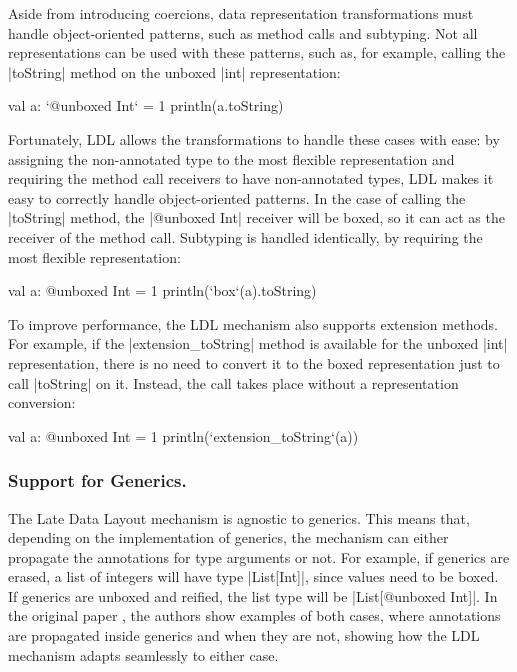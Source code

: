 Aside from introducing coercions, data representation transformations must handle object-oriented patterns, such as method calls and subtyping. Not all representations can be used with these patterns, such as, for example, calling the |toString| method on the unboxed |int| representation:

\begin{lstlisting-nobreak}
val a: `@unboxed Int` = 1
println(a.toString)
\end{lstlisting-nobreak}

Fortunately, LDL allows the transformations to handle these cases with ease: by assigning the non-annotated type to the most flexible representation and requiring the method call receivers to have non-annotated types, LDL makes it easy to correctly handle object-oriented patterns. In the case of calling the |toString| method, the |@unboxed Int| receiver will be boxed, so it can act as the receiver of the method call. Subtyping is handled identically, by requiring the most flexible representation:

\begin{lstlisting-nobreak}
val a: @unboxed Int = 1
println(`box`(a).toString)
\end{lstlisting-nobreak}

To improve performance, the LDL mechanism also supports extension methods. For example, if the |extension_toString| method is available for the unboxed |int| representation, there is no need to convert it to the boxed representation just to call |toString| on it. Instead, the call takes place without a representation conversion:

\begin{lstlisting-nobreak}
val a: @unboxed Int = 1
println(`extension_toString`(a))
\end{lstlisting-nobreak}

\subsubsection{Support for Generics.}
The Late Data Layout mechanism is agnostic to generics. This means that, depending on the implementation of generics, the mechanism can either propagate the annotations for type arguments or not. For example, if generics are erased, a list of integers will have type |List[Int]|, since values need to be boxed. If generics are unboxed and reified, the list type will be |List[@unboxed Int]|. In the original paper \cite{ldl}, the authors show examples of both cases, where annotations are propagated inside generics and when they are not, showing how the LDL mechanism adapts seamlessly to either case.

